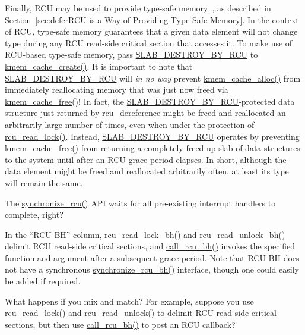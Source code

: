 Finally, RCU may be used to provide
type-safe memory~\cite{Cheriton96a}, as described in
Section~\ref{sec:deferRCU is a Way of Providing Type-Safe Memory}.
In the context of RCU, type-safe memory guarantees that a given
data element will not change type during any RCU read-side critical section
that accesses it.
To make use of RCU-based type-safe memory, pass
\url{SLAB_DESTROY_BY_RCU} to
\url{kmem_cache_create()}.
It is important to note that \url{SLAB_DESTROY_BY_RCU} will
\emph{in no way}
prevent \url{kmem_cache_alloc()} from immediately reallocating
memory that was just now freed via \url{kmem_cache_free()}!
In fact, the \url{SLAB_DESTROY_BY_RCU}-protected data structure
just returned by \url{rcu_dereference} might be freed and reallocated
an arbitrarily large number of times, even when under the protection
of \url{rcu_read_lock()}.
Instead, \url{SLAB_DESTROY_BY_RCU} operates by preventing
\url{kmem_cache_free()}
from returning a completely freed-up slab of data structures
to the system until after an RCU grace period elapses.
In short, although the data element might be freed and reallocated arbitrarily
often, at least its type will remain the same.

\QuickQuiz{}
	The \url{synchronize_rcu()} API waits for all pre-existing
	interrupt handlers to complete, right?
 \QuickQuizEnd

In the ``RCU BH'' column, \url{rcu_read_lock_bh()} and
\url{rcu_read_unlock_bh()} delimit RCU read-side critical
sections, and \url{call_rcu_bh()} invokes the specified
function and argument after a subsequent grace period.
Note that RCU BH does not have a synchronous \url{synchronize_rcu_bh()}
interface,
though one could easily be added if required.

\QuickQuiz{}
	What happens if you mix and match?
	For example, suppose you use \url{rcu_read_lock()} and
	\url{rcu_read_unlock()} to delimit RCU read-side critical
	sections, but then use \url{call_rcu_bh()} to post an
	RCU callback?
 \QuickQuizEnd

